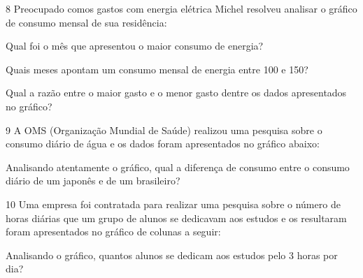 \num{8} Preocupado comos gastos com energia elétrica Michel resolveu
analisar o gráfico de consumo mensal de sua residência:


\begin{escolha}
\item
  Qual foi o mês que apresentou o maior consumo de energia?


\item
  Quais meses apontam um consumo mensal de energia entre 100 e 150?


\item
  Qual a razão entre o maior gasto e o menor gasto dentre os dados
  apresentados no gráfico?

\end{escolha}


\num{9} A OMS (Organização Mundial de Saúde) realizou uma pesquisa sobre o
consumo diário de água e os dados foram apresentados no gráfico abaixo:


Analisando atentamente o gráfico, qual a diferença de consumo entre o
consumo diário de um japonês e de um brasileiro?



\num{10} Uma empresa foi contratada para realizar uma pesquisa sobre o
número de horas diárias que um grupo de alunos se dedicavam aos estudos
e os resultaram foram apresentados no gráfico de colunas a seguir:


Analisando o gráfico, quantos alunos se dedicam aos estudos pelo 3 horas
por dia?





